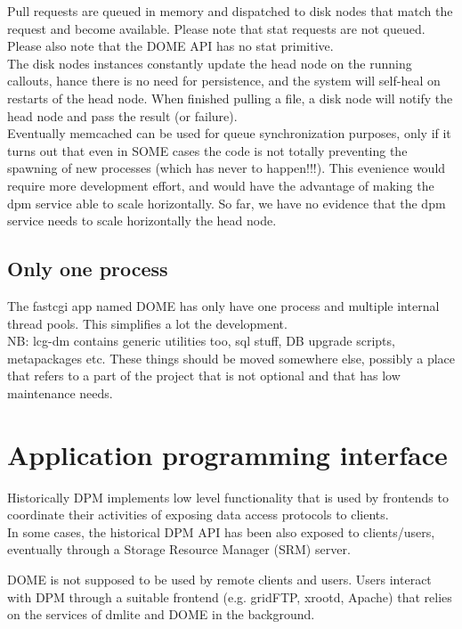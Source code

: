 \documentclass[a4paper,10pt]{scrreprt}
\begin{document}
Pull requests are queued in memory and dispatched to disk nodes that match the request and become available. Please note that stat requests are not queued. Please also note that the DOME API has no stat primitive.\\
The disk nodes instances constantly update the head node on the running callouts, hance there is no need for persistence,
and the system will self-heal on restarts of the head node. When finished pulling a file, a disk node will notify the head node and pass the result (or failure).\\

Eventually memcached can be used for queue synchronization purposes, only if it turns out that even in SOME cases the code is not totally
preventing the spawning of new processes (which has never to happen!!!). This evenience would require more development effort, and would have the
advantage of making the dpm service able to scale horizontally. So far, we have no evidence that the dpm service needs to scale horizontally the head node.\\

\subsection{Only one process}
 The fastcgi app named DOME has only have one process and multiple internal thread pools. This simplifies a lot the development.\\




 NB: lcg-dm contains generic utilities too, sql stuff, DB upgrade scripts, metapackages etc. These things should be moved somewhere else,
 possibly a place that refers to a part of the project that is not optional and that has low maintenance needs.\\



\section{Application programming interface}

Historically DPM implements low level functionality that is used by frontends to coordinate
their activities of exposing data access protocols to clients.\\
In some cases, the historical DPM API has been also exposed to clients/users, eventually through a
Storage Resource Manager (SRM) server.

DOME is not supposed to be used by remote clients and users. Users interact with DPM through a suitable frontend (e.g. gridFTP, xrootd, Apache) that
relies on the services of dmlite and DOME in the background.
\end{document}
